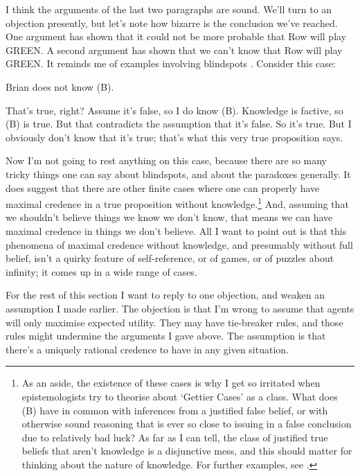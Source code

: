 I think the arguments of the last two paragraphs are sound. We'll turn to an objection presently, but let's note how bizarre is the conclusion we've reached. One argument has shown that it could not be more probable that Row will play GREEN. A second argument has shown that we can't know that Row will play GREEN. It reminds me of examples involving blindspots \citep{Sorensen1988}. Consider this case:

\begin{enumerate*}
\renewcommand{\labelenumi}{(\Alph{enumi})}
\setcounter{enumi}{1}
\item Brian does not know (B).
\end{enumerate*}
That's true, right? Assume it's false, so I do know (B). Knowledge is factive, so (B) is true. But that contradicts the assumption that it's false. So it's true. But I obviously don't know that it's true; that's what this very true proposition says.

Now I'm not going to rest anything on this case, because there are so many tricky things one can say about blindspots, and about the paradoxes generally. It does suggest that there are other finite cases where one can properly have maximal credence in a true proposition without knowledge.\footnote{As an aside, the existence of these cases is why I get so irritated when epistemologists try to theorise about `Gettier Cases' as a class. What does (B) have in common with inferences from a justified false belief, or with otherwise sound reasoning that is ever so close to issuing in a false conclusion due to relatively bad luck? As far as I can tell, the class of justified true beliefs that aren't knowledge is a disjunctive mess, and this should matter for thinking about the nature of knowledge. For further examples, see \cite{WilliamsonLofoten}.} And, assuming that we shouldn't believe things we know we don't know, that means we can have maximal credence in things we don't believe. All I want to point out is that this phenomena of maximal credence without knowledge, and presumably without full belief, isn't a quirky feature of self-reference, or of games, or of puzzles about infinity; it comes up in a wide range of cases.

For the rest of this section I want to reply to one objection, and weaken an assumption I made earlier. The objection is that I'm wrong to assume that agents will only maximise expected utility. They may have tie-breaker rules, and those rules might undermine the arguments I gave above. The assumption is that there's a uniquely rational credence to have in any given situation.

